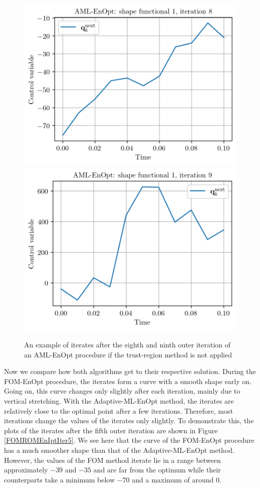 \begin{figure}
\centering
\includegraphics{Plots/noTRIteration8.png}
\includegraphics{Plots/noTRIteration9.png}
\caption{\label{noTRResults}An example of iterates after the eighth and ninth outer iteration of an AML-EnOpt procedure if the trust-region method is not applied}
\end{figure}

Now we compare how both algorithms get to their respective solution. During the FOM-EnOpt procedure, the iterates form a curve with a smooth shape early on. Going on, this curve changes only slightly after each iteration, mainly due to vertical stretching. With the Adaptive-ML-EnOpt method, the iterates are relatively close to the optimal point after a few iterations. Therefore, most iterations change the values of the iterates only slightly. To demonstrate this, the plots of the iterates after the fifth outer iteration are shown in Figure \ref{FOMROMEnIptIter5}. We see here that the curve of the FOM-EnOpt procedure has a much smoother shape than that of the Adaptive-ML-EnOpt method. However, the values of the FOM method iterate lie in a range between approximately $-39$ and $-35$ and are far from the optimum while their counterparts take a minimum below $-70$ and a maximum of around $0$.\\

